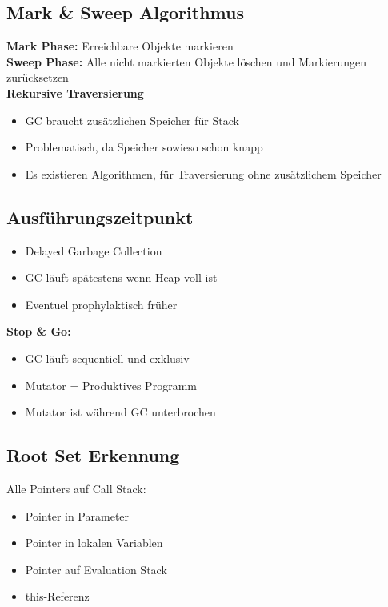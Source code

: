 \subsection{Mark \& Sweep Algorithmus}
\textbf{Mark Phase:} Erreichbare Objekte markieren\\
\textbf{Sweep Phase:} Alle nicht markierten Objekte löschen und Markierungen zurücksetzen\\
\textbf{Rekursive Traversierung}
\begin{itemize}[topsep=0pt]
    \itemsep -0.2em
    \item GC braucht zusätzlichen Speicher für Stack
    \item Problematisch, da Speicher sowieso schon knapp
    \item Es existieren Algorithmen, für Traversierung ohne zusätzlichem Speicher
\end{itemize}

\subsection{Ausführungszeitpunkt}
\begin{itemize}[topsep=0pt]
    \itemsep -0.2em
    \item Delayed Garbage Collection
    \item GC läuft spätestens wenn Heap voll ist
    \item Eventuel prophylaktisch früher
\end{itemize}

\textbf{Stop \& Go:}
\begin{itemize}[topsep=0pt]
    \itemsep -0.2em
    \item GC läuft sequentiell und exklusiv
    \item Mutator = Produktives Programm
    \item Mutator ist während GC unterbrochen
\end{itemize}

\subsection{Root Set Erkennung}
Alle Pointers auf Call Stack:
\begin{itemize}[topsep=0pt]
    \itemsep -0.2em
    \item Pointer in Parameter
    \item Pointer in lokalen Variablen
    \item Pointer auf Evaluation Stack
    \item this-Referenz
\end{itemize}

